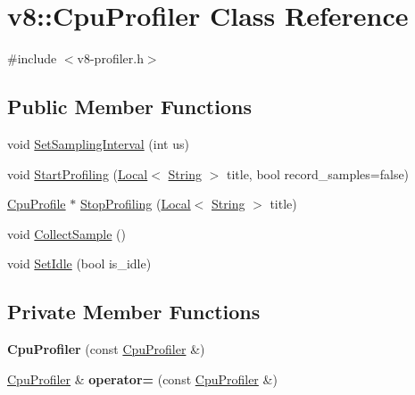 \hypertarget{classv8_1_1_cpu_profiler}{}\section{v8\+:\+:Cpu\+Profiler Class Reference}
\label{classv8_1_1_cpu_profiler}


{\ttfamily \#include $<$v8-\/profiler.\+h$>$}

\subsection*{Public Member Functions}
\begin{DoxyCompactItemize}
\item 
void \hyperlink{classv8_1_1_cpu_profiler_ac5b05c72fb899e20adfa7f8cc57f21fb}{Set\+Sampling\+Interval} (int us)
\item 
void \hyperlink{classv8_1_1_cpu_profiler_a7a9b75d3d7285d90344e1b8f14e97076}{Start\+Profiling} (\hyperlink{classv8_1_1_local}{Local}$<$ \hyperlink{classv8_1_1_string}{String} $>$ title, bool record\+\_\+samples=false)
\item 
\hyperlink{classv8_1_1_cpu_profile}{Cpu\+Profile} $\ast$ \hyperlink{classv8_1_1_cpu_profiler_a34acaa3b0e40cf2f92e9e6acb3fb5de7}{Stop\+Profiling} (\hyperlink{classv8_1_1_local}{Local}$<$ \hyperlink{classv8_1_1_string}{String} $>$ title)
\item 
void \hyperlink{classv8_1_1_cpu_profiler_ac497150fc1bced99d37d0ac1e932defa}{Collect\+Sample} ()
\item 
void \hyperlink{classv8_1_1_cpu_profiler_a68e6da6f9ff4a0d3bde505f378a9a7fa}{Set\+Idle} (bool is\+\_\+idle)
\end{DoxyCompactItemize}
\subsection*{Private Member Functions}
\begin{DoxyCompactItemize}
\item 
{\bfseries Cpu\+Profiler} (const \hyperlink{classv8_1_1_cpu_profiler}{Cpu\+Profiler} \&)\hypertarget{classv8_1_1_cpu_profiler_acd636cc747bdb4859a2008131114d8db}{}\label{classv8_1_1_cpu_profiler_acd636cc747bdb4859a2008131114d8db}

\item 
\hyperlink{classv8_1_1_cpu_profiler}{Cpu\+Profiler} \& {\bfseries operator=} (const \hyperlink{classv8_1_1_cpu_profiler}{Cpu\+Profiler} \&)\hypertarget{classv8_1_1_cpu_profiler_a829217b88e4f452ed9f890365c715488}{}\label{classv8_1_1_cpu_profiler_a829217b88e4f452ed9f890365c715488}

\end{DoxyCompactItemize}


